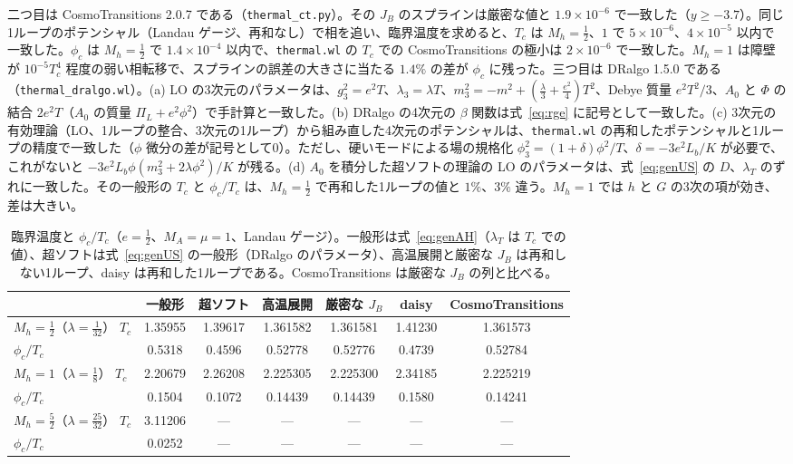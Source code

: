 \documentclass[a4paper,10pt]{ltjsarticle}
\begin{document}
二つ目は CosmoTransitions 2.0.7 である（\texttt{thermal\_ct.py}）。その $J_B$ のスプラインは厳密な値と $1.9\times10^{-6}$ で一致した（$y\ge-3.7$）。同じ1ループのポテンシャル（Landau ゲージ、再和なし）で相を追い、臨界温度を求めると、$T_c$ は $M_h=\frac12$、$1$ で $5\times10^{-6}$、$4\times10^{-5}$ 以内で一致した。$\phi_c$ は $M_h=\frac12$ で $1.4\times10^{-4}$ 以内で、\texttt{thermal.wl} の $T_c$ での CosmoTransitions の極小は $2\times10^{-6}$ で一致した。$M_h=1$ は障壁が $10^{-5}T_c^4$ 程度の弱い相転移で、スプラインの誤差の大きさに当たる $1.4\%$ の差が $\phi_c$ に残った。三つ目は DRalgo 1.5.0 である（\texttt{thermal\_dralgo.wl}）。(a) LO の3次元のパラメータは、$g_3^2=e^2T$、$\lambda_3=\lambda T$、$m_3^2=-m^2+(\frac\lambda3+\frac{e^2}4)T^2$、Debye 質量 $e^2T^2/3$、$A_0$ と $\Phi$ の結合 $2e^2T$（$A_0$ の質量 $\Pi_L+e^2\phi^2$）で手計算と一致した。(b) DRalgo の4次元の $\beta$ 関数は式~\eqref{eq:rge} に記号として一致した。(c) 3次元の有効理論（LO、1ループの整合、3次元の1ループ）から組み直した4次元のポテンシャルは、\texttt{thermal.wl} の再和したポテンシャルと1ループの精度で一致した（$\phi$ 微分の差が記号として0）。ただし、硬いモードによる場の規格化 $\phi_3^2=(1+\delta)\phi^2/T$、$\delta=-3e^2L_b/K$ が必要で、これがないと $-3e^2L_b\phi(m_3^2+2\lambda\phi^2)/K$ が残る。(d) $A_0$ を積分した超ソフトの理論の LO のパラメータは、式~\eqref{eq:genUS} の $D$、$\lambda_T$ のずれに一致した。その一般形の $T_c$ と $\phi_c/T_c$ は、$M_h=\frac12$ で再和した1ループの値と $1\%$、$3\%$ 違う。$M_h=1$ では $h$ と $G$ の3次の項が効き、差は大きい。

\begin{table}[tbp]
\centering\small
\caption{臨界温度と $\phi_c/T_c$（$e=\frac12$、$M_A=\mu=1$、Landau ゲージ）。一般形は式~\eqref{eq:genAH}（$\lambda_T$ は $T_c$ での値）、超ソフトは式~\eqref{eq:genUS} の一般形（DRalgo のパラメータ）、高温展開と厳密な $J_B$ は再和しない1ループ、daisy は再和した1ループである。CosmoTransitions は厳密な $J_B$ の列と比べる。}
\label{tab:thermal}
\begin{tabular}{lcccccc}
\toprule
& 一般形 & 超ソフト & 高温展開 & 厳密な $J_B$ & daisy & CosmoTransitions \\
\midrule
$M_h=\frac12$（$\lambda=\frac1{32}$） $T_c$ & 1.35955 & 1.39617 & 1.361582 & 1.361581 & 1.41230 & 1.361573 \\
\phantom{$M_h=\frac12$（$\lambda=\frac1{32}$）} $\phi_c/T_c$ & 0.5318 & 0.4596 & 0.52778 & 0.52776 & 0.4739 & 0.52784 \\
$M_h=1$（$\lambda=\frac18$） $T_c$ & 2.20679 & 2.26208 & 2.225305 & 2.225300 & 2.34185 & 2.225219 \\
\phantom{$M_h=1$（$\lambda=\frac18$）} $\phi_c/T_c$ & 0.1504 & 0.1072 & 0.14439 & 0.14439 & 0.1580 & 0.14241 \\
$M_h=\frac52$（$\lambda=\frac{25}{32}$） $T_c$ & 3.11206 & — & — & — & — & — \\
\phantom{$M_h=\frac52$（$\lambda=\frac{25}{32}$）} $\phi_c/T_c$ & 0.0252 & — & — & — & — & — \\
\bottomrule
\end{tabular}
\end{table}
\end{document}
